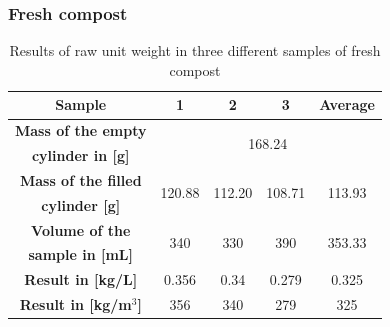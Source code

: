 \documentclass{article}
\begin{document}
\subsubsection{Fresh compost}
\renewcommand{\arraystretch}{1.5}
\begin{table}[ht!]
    \centering \vspace{.3cm}
    \caption{Results of raw unit weight in three different samples of fresh compost}
    \begin{tabular}{|c|c|c|c|c|}
        \hline
        \textbf{Sample} & \textbf{1} & \textbf{2} & \textbf{3} & \textbf{Average}\\
        \hline
        {\textbf{Mass of the empty}} & \multicolumn{4}{c|}{\multirow{2}{*}{168.24}}\\
        \textbf{cylinder in [g]} & \multicolumn{4}{c|}{}\\
        \hline
        \textbf{Mass of the filled} & \multirow{2}{*}{120.88} & \multirow{2}{*}{112.20} & \multirow{2}{*}{108.71} & \multirow{2}{*}{113.93}\\
        \textbf{cylinder [g]} & & & &\\
        \hline
        \textbf{Volume of the} & \multirow{2}{*}{340} & \multirow{2}{*}{330} & \multirow{2}{*}{390} & \multirow{2}{*}{353.33}\\
        \textbf{sample in [mL]} & & & &\\
        \hline
        \textbf{Result in [kg/L]} & 0.356 & 0.34 & 0.279 & 0.325\\
        \hline
        \textbf{Result in [kg/m$^3$]} & 356 & 340 & 279 & 325\\
        \hline
    \end{tabular}
\end{table}

\newpage
\end{document}
